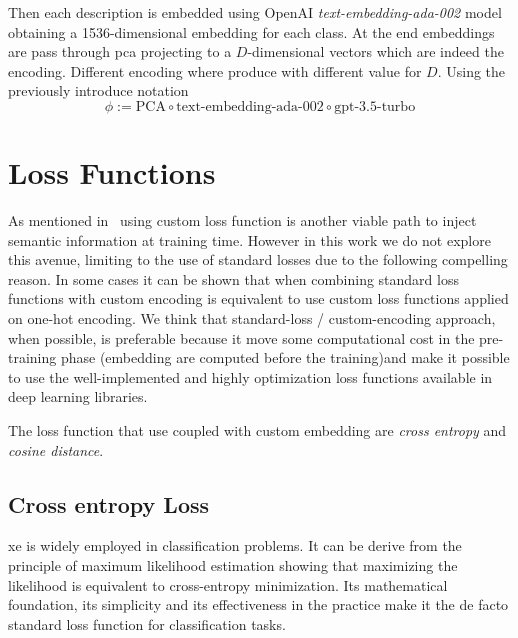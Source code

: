 \vspace{10pt}

Then each description is embedded using OpenAI \emph{text-embedding-ada-002}
model obtaining a 1536-dimensional embedding for each class. At the end
embeddings are pass through \acrshort{pca} projecting to a $D$-dimensional
vectors which are indeed the encoding. Different encoding where produce with
different value for $D$. Using the previously introduce notation
\begin{equation}
  \phi := \textrm{PCA} \circ \textrm{text-embedding-ada-002} \circ
  \textrm{gpt-3.5-turbo}
  \label{eq:desc-pca}
\end{equation}



\section{Loss Functions}
\label{sec:losses}

As mentioned in~ using custom loss function is another
viable path to inject semantic information at training time. However in this
work we do not explore this avenue, limiting to the use of standard losses due
to the following compelling reason. In some cases it can be shown that when
combining standard loss functions with custom encoding is equivalent to use
custom loss functions applied on one-hot encoding. We think that standard-loss /
custom-encoding approach, when possible, is preferable because it move some
computational cost in the pre-training phase (embedding are computed before the
training)and make it possible to use the well-implemented and highly
optimization loss functions available in deep learning libraries.

The loss function that use coupled with custom embedding are \emph{cross
entropy} and \emph{cosine distance}.

\subsection{Cross entropy Loss}
\label{subsec:cross-entropy-loss}

\acrfull{xe} is widely employed in classification problems. It can be derive
from the principle of maximum likelihood estimation showing that maximizing the
likelihood is equivalent to cross-entropy minimization. Its mathematical
foundation, its simplicity and its effectiveness in the practice make it the de
facto standard loss function for classification tasks.

